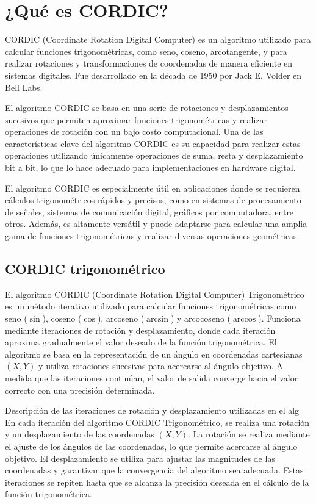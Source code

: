 \documentclass[12pt,a4paper, twoside]{article} %
\begin{document}
\section{¿Qué es CORDIC?}
\label{sec:orgc1c4017}

CORDIC (Coordinate Rotation Digital Computer) es un algoritmo utilizado para calcular funciones trigonométricas, como seno, coseno, arcotangente, y para realizar rotaciones y transformaciones de coordenadas de manera eficiente en sistemas digitales. Fue desarrollado en la década de 1950 por Jack E. Volder en Bell Labs.

El algoritmo CORDIC se basa en una serie de rotaciones y desplazamientos sucesivos que permiten aproximar funciones trigonométricas y realizar operaciones de rotación con un bajo costo computacional. Una de las características clave del algoritmo CORDIC es su capacidad para realizar estas operaciones utilizando únicamente operaciones de suma, resta y desplazamiento bit a bit, lo que lo hace adecuado para implementaciones en hardware digital.

El algoritmo CORDIC es especialmente útil en aplicaciones donde se requieren cálculos trigonométricos rápidos y precisos, como en sistemas de procesamiento de señales, sistemas de comunicación digital, gráficos por computadora, entre otros. Además, es altamente versátil y puede adaptarse para calcular una amplia gama de funciones trigonométricas y realizar diversas operaciones geométricas.



\subsection{CORDIC trigonométrico}
\label{sec:orgdaca22c}


El algoritmo CORDIC (Coordinate Rotation Digital Computer) Trigonométrico es un método iterativo utilizado para calcular funciones trigonométricas como seno ($\sin$), coseno ($\cos$), arcoseno ($\arcsin$) y arcocoseno ($\arccos$). Funciona mediante iteraciones de rotación y desplazamiento, donde cada iteración aproxima gradualmente el valor deseado de la función trigonométrica. El algoritmo se basa en la representación de un ángulo en coordenadas cartesianas $(X, Y)$ y utiliza rotaciones sucesivas para acercarse al ángulo objetivo. A medida que las iteraciones continúan, el valor de salida converge hacia el valor correcto con una precisión determinada.

Descripción de las iteraciones de rotación y desplazamiento utilizadas en el alg
En cada iteración del algoritmo CORDIC Trigonométrico, se realiza una rotación y un desplazamiento de las coordenadas $(X, Y)$. La rotación se realiza mediante el ajuste de los ángulos de las coordenadas, lo que permite acercarse al ángulo objetivo. El desplazamiento se utiliza para ajustar las magnitudes de las coordenadas y garantizar que la convergencia del algoritmo sea adecuada. Estas iteraciones se repiten hasta que se alcanza la precisión deseada en el cálculo de la función trigonométrica.
\end{document}
